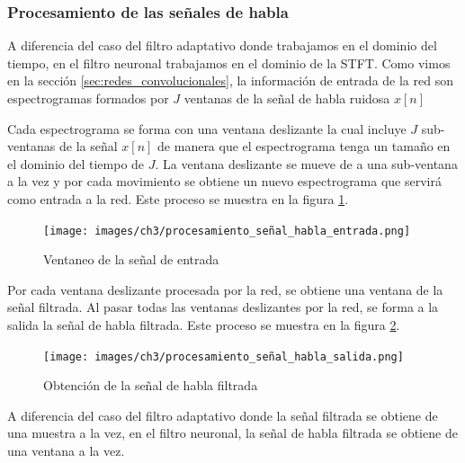 \subsubsection{Procesamiento de las señales de habla}
\label{sec:filtro_neuronal_procesamiento_de_señales}

A diferencia del caso del filtro adaptativo donde trabajamos en el dominio del tiempo, en el filtro neuronal trabajamos en el dominio de la STFT. Como vimos en la sección \ref{sec:redes_convolucionales}, la información de entrada de la red son espectrogramas formados por $J$ ventanas de la señal de habla ruidosa $x[n]$ 

Cada espectrograma se forma con una ventana deslizante la cual incluye $J$ sub-ventanas de la señal $x[n]$ de manera que el espectrograma tenga un tamaño en el dominio del tiempo de $J$. La ventana deslizante se mueve de a una sub-ventana a la vez y por cada movimiento se obtiene un nuevo espectrograma que servirá como entrada a la red. Este proceso se muestra en la figura \ref{fig:ch3_procesamiento_señal_habla_entrada}.

\begin{figure}
	\centering
	\centerline{\texttt{[image: images/ch3/procesamiento\_señal\_habla\_entrada.png]}}
	\caption{Ventaneo de la señal de entrada}
	\label{fig:ch3_procesamiento_señal_habla_entrada}
\end{figure}

Por cada ventana deslizante procesada por la red, se obtiene una ventana de la señal filtrada. Al pasar todas las ventanas deslizantes por la red, se forma a la salida la señal de habla filtrada. Este proceso se muestra en la figura \ref{fig:ch3_procesamiento_señal_habla_salida}.

\begin{figure}
	\centering
	\centerline{\texttt{[image: images/ch3/procesamiento\_señal\_habla\_salida.png]}}
	\caption{Obtención de la señal de habla filtrada}
	\label{fig:ch3_procesamiento_señal_habla_salida}
\end{figure}

A diferencia del caso del filtro adaptativo donde la señal filtrada se obtiene de una muestra a la vez, en el filtro neuronal, la señal de habla filtrada se obtiene de una ventana a la vez.